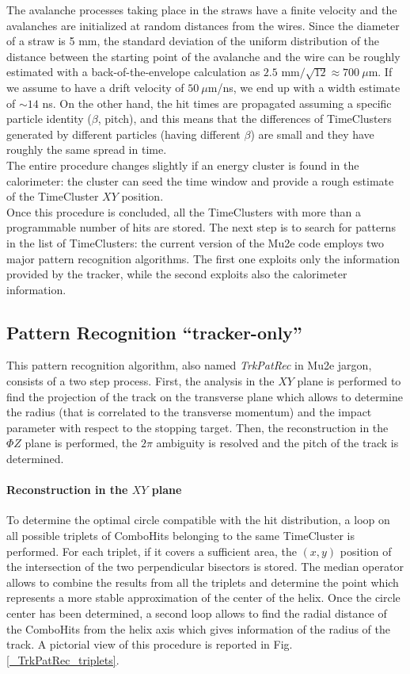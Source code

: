 \documentclass[12pt,a4paper,openright, oneside, titlepage]{book} %
\begin{document}
\noindent The avalanche processes taking place in the straws have a finite velocity and the avalanches are initialized at random distances from the wires. 
Since the diameter of a straw is 5 mm, the standard deviation of the uniform distribution of the distance between the starting point of the avalanche and the wire can be roughly estimated with a back-of-the-envelope calculation as $2.5$ mm$/\sqrt{12}\approx 700\ \mu$m. 
If we assume to have a drift velocity of $50\ \mu$m/ns, we end up with a width estimate of $\sim 14$ ns. 
On the other hand, the hit times are propagated assuming a specific particle identity ($\beta$, pitch), and this means that the differences of TimeClusters generated by different particles (having different $\beta$) are small and they have roughly the same spread in time.\\
The entire procedure changes slightly if an energy cluster is found in the calorimeter: the cluster can seed the time window and provide a rough estimate of the TimeCluster $XY$ position.\\

\noindent Once this procedure is concluded, all the TimeClusters with more than a programmable number of hits are stored. 
The next step is to search for patterns in the list of TimeClusters:  the current version of the Mu2e code employs two major pattern recognition algorithms. 
The first one exploits only the information provided by the tracker, while the second exploits also the calorimeter information.

\subsection{Pattern Recognition ``tracker-only''}
This pattern recognition algorithm, also named \textit{TrkPatRec} in Mu2e jargon, consists of a two step process. 
First, the analysis in the $XY$ plane is performed to find the projection of the track on the transverse plane which allows to determine the radius (that is correlated to the transverse momentum) and the impact parameter with respect to the stopping target. 
Then, the reconstruction in the $\Phi Z$ plane is performed, the $2\pi$ ambiguity is resolved and the pitch of the track is determined.

\paragraph{Reconstruction in the $XY$ plane} To determine the optimal circle compatible with the hit distribution, 
a loop on all possible triplets of ComboHits belonging to the same TimeCluster is performed. 
For each triplet, if it covers a sufficient area, the $(x,y)$ position of the intersection 
of the two perpendicular bisectors is stored. 
The median operator allows to combine the results from all the triplets and determine 
the point which represents a more stable approximation of the center of the helix. 
Once the circle center has been determined, 
a second loop allows to find the radial distance of the ComboHits from the helix axis 
which gives information of the radius of the track. 
A pictorial view of this procedure is reported in Fig. \ref{_TrkPatRec_triplets}.
\end{document}

